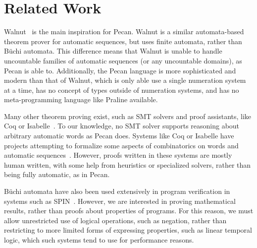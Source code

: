 \section{Related Work}\label{sec:related-work}

Walnut~\cite{walnut} is the main inspiration for Pecan.
Walnut is a similar automata-based theorem prover for automatic sequences, but uses finite automata, rather than B\"uchi automata.
This difference means that Walnut is unable to handle uncountable families of automatic sequences (or any uncountable domains), as Pecan is able to.
Additionally, the Pecan language is more sophisticated and modern than that of Walnut, which is only able use a single numeration system at a time, has no concept of types outside of numeration systems, and has no meta-programming language like Praline available.

Many other theorem proving exist, such as SMT solvers and proof assistants, like Coq or Isabelle~\cite{nipkow2002isabelle,the_coq_development_team_2020_3744225}.
To our knowledge, no SMT solver supports reasoning about arbitrary automatic words as Pecan does.
Systems like Coq or Isabelle have projects attempting to formalize some aspects of combinatorics on words and automatic sequences~\cite{hivert2018littlewoodrichardson,holub2020binary}.
However, proofs written in these systems are mostly human written, with some help from heuristics or specialized solvers, rather than being fully automatic, as in Pecan.

B\"uchi automata have also been used extensively in program verification in systems such as SPIN~\cite{gerard2003spin}.
However, we are interested in proving mathematical results, rather than proofs about properties of programs.
For this reason, we must allow unrestricted use of logical operations, such as negation, rather than restricting to more limited forms of expressing properties, such as linear temporal logic, which such systems tend to use for performance reasons.
